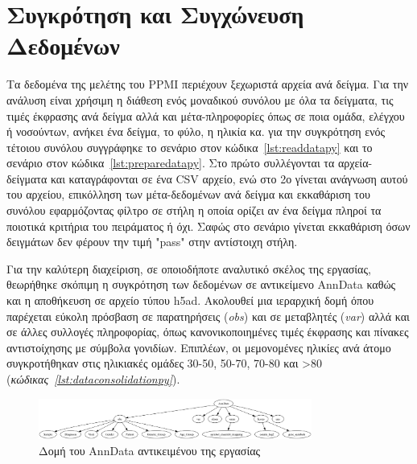 \documentclass[12pt]{report}
\begin{document}
    \section{Συγκρότηση και Συγχώνευση Δεδομένων}
        \par
            Τα δεδομένα της μελέτης του PPMI περιέχουν ξεχωριστά αρχεία ανά δείγμα. Για την ανάλυση είναι χρήσιμη η διάθεση ενός μοναδικού συνόλου με όλα τα δείγματα, τις τιμές έκφρασης ανά δείγμα αλλά και μέτα-πληροφορίες όπως σε ποια ομάδα, ελέγχου ή νοσούντων, ανήκει ένα δείγμα, το φύλο, η ηλικία κα. για την συγκρότηση ενός τέτοιου συνόλου συγγράφηκε το σενάριο στον κώδικα~\ref{lst:readdatapy} και το σενάριο στον κώδικα~\ref{lst:preparedatapy}. Στο πρώτο συλλέγονται τα αρχεία-δείγματα και καταγράφονται σε ένα CSV αρχείο, ενώ στο 2ο γίνεται ανάγνωση αυτού του αρχείου, επικόλληση των μέτα-δεδομένων ανά δείγμα και εκκαθάριση του συνόλου εφαρμόζοντας φίλτρο σε στήλη η οποία ορίζει αν ένα δείγμα πληροί τα ποιοτικά κριτήρια του πειράματος ή όχι. Σαφώς στο σενάριο γίνεται εκκαθάριση όσων δειγμάτων δεν φέρουν την τιμή "pass" στην αντίστοιχη στήλη.
        \par
            Για την καλύτερη διαχείριση, σε οποιοδήποτε αναλυτικό σκέλος της εργασίας, θεωρήθηκε σκόπιμη η συγκρότηση των δεδομένων σε αντικείμενο AnnData καθώς και η αποθήκευση σε αρχείο τύπου h5ad. Ακολουθεί μια ιεραρχική δομή όπου παρέχεται εύκολη πρόσβαση σε παρατηρήσεις (\emph{obs}) και σε μεταβλητές (\emph{var}) αλλά και σε άλλες συλλογές πληροφορίας, όπως κανονικοποιημένες τιμές έκφρασης και πίνακες αντιστοίχησης με σύμβολα γονιδίων. Επιπλέων, οι μεμονομένες ηλικίες ανά άτομο συγκροτήθηκαν στις ηλικιακές ομάδες 30-50, 50-70, 70-80 και >80 (\emph{κώδικας~\ref{lst:dataconsolidationpy}}).
            \begin{figure}[h]
                \centering
                \includegraphics[width=0.8\textwidth]{anndata_structure.png}
                \caption{Δομή του AnnData αντικειμένου της εργασίας}
                \label{fig:figure-1}
            \end{figure}
\end{document}
